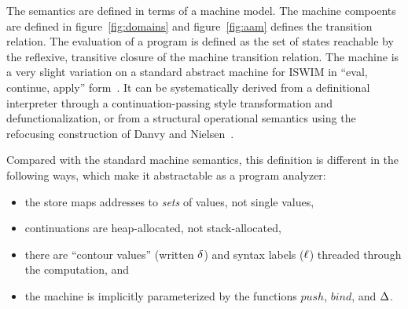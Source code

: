 \documentclass[preprint,onecolumn,9pt]{sigplanconf} %
\begin{document}
The semantics are defined in terms of a machine model.  The machine
compoents are defined in figure~\ref{fig:domains} and
figure~\ref{fig:aam} defines the transition relation.  The evaluation
of a program is defined as the set of states reachable by the
reflexive, transitive closure of the machine transition relation.  The
machine is a very slight variation on a standard abstract machine for
ISWIM in ``eval, continue, apply'' form~\cite{dvanhorn:Danvy:DSc}.  It
can be systematically derived from a definitional interpreter through
a continuation-passing style transformation and defunctionalization,
or from a structural operational semantics using the refocusing
construction of Danvy and
Nielsen~\cite{dvanhorn:Danvy-Nielsen:RS-04-26}.

Compared with the standard machine semantics, this definition is
different in the following ways, which make it abstractable as a
program analyzer:
\begin{itemize}
\item the store maps addresses to \emph{sets} of values, not
  single values,
\item continuations are heap-allocated, not stack-allocated,
\item there are ``contour values'' (written ${\delta}$) and syntax
  labels (${\ell}$) threaded through the computation, and
\item the machine is implicitly parameterized by the functions
  $\mathit{push}$, $\mathit{bind}$, and $\Delta$.
\end{itemize}
\end{document}
